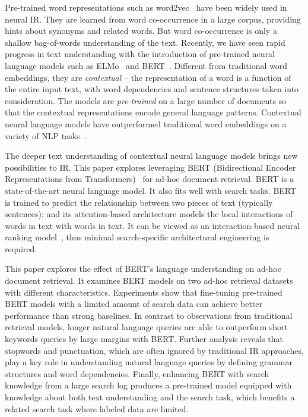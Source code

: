 \documentclass[sigconf]{acmart}
\begin{document}
Pre-trained word representations such as word2vec~\cite{word2vec} have been widely used in neural IR. They are learned from word co-occurrence in a large corpus, providing hints about synonyms and related words. But word co-occurrence is only a shallow bag-of-words understanding of the text.  Recently, we have seen rapid progress in text understanding with the introduction of pre-trained neural language models such as ELMo~\cite{Peters:2018} and BERT~\cite{devlin2018bert}. 
Different from traditional word embeddings, they are \emph{contextual}  -- the representation of a word is a function of the entire input text, with word dependencies and sentence structures taken into consideration. The models are \emph{pre-trained} on a large number of documents so that the contextual representations encode general language patterns. Contextual neural language models have outperformed traditional word embeddings on a variety of NLP tasks~\cite{Peters:2018, devlin2018bert}.



The deeper text understanding of contextual neural language models brings new possibilities to IR. This paper explores leveraging BERT (Bidirectional Encoder Representations from Transformers)~\cite{devlin2018bert} for ad-hoc document retrieval. BERT is a state-of-the-art neural language model. It also fits well with search tasks. 
BERT is trained to predict the relationship between two pieces of text (typically sentences); and its attention-based architecture models the local interactions of words in text with words in text.  It can be viewed as an interaction-based neural ranking model~\cite{DRMM}, thus minimal search-specific architectural engineering is required.  









This paper explores the effect of BERT's language understanding on ad-hoc document retrieval. It examines BERT models on two ad-hoc retrieval datasets with different characteristics.  Experiments show that fine-tuning pre-trained BERT models with a limited amount of search data can achieve better performance than strong baselines. In contrast to observations from traditional retrieval models, longer natural language queries are able to outperform short keywords queries by large margins with BERT. Further analysis reveals that stopwords and punctuation, which are often ignored by traditional IR approaches, play a key role in understanding natural language queries by defining grammar structures and word dependencies. Finally, enhancing BERT with search knowledge from a large search log produces a pre-trained model equipped with knowledge about both text understanding and the search task, which benefits a related search task where labeled data are limited.
\end{document}
